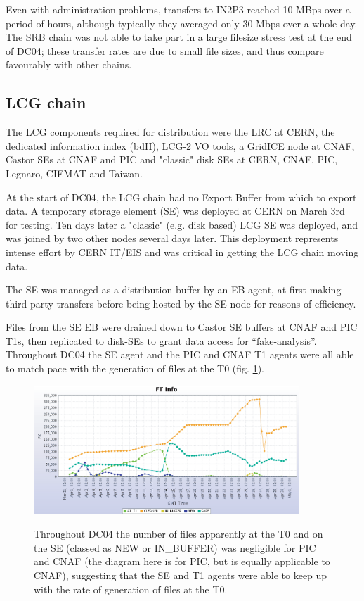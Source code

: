 \documentclass{cmspaper}
\begin{document}
Even with administration problems, transfers to IN2P3 reached 10 MBps over a period of hours, although typically they averaged only 30 Mbps over a whole day. The SRB chain was not able to take part in a large filesize stress test at the end of DC04; these transfer rates are due to small file sizes, and thus compare favourably with other chains.

\subsection{LCG chain}
The LCG components required for distribution were the LRC at CERN, the dedicated information index (bdII), LCG-2 VO tools, a GridICE node at CNAF, Castor SEs at CNAF and PIC and "classic" disk SEs at CERN, CNAF, PIC, Legnaro, CIEMAT and Taiwan.

At the start of DC04, the LCG chain had no Export Buffer from which to export data. A temporary storage element (SE) was deployed at CERN on March 3rd for testing. Ten days later a "classic" (e.g. disk based) LCG SE was deployed, and was joined by two other nodes several days later. This deployment represents intense effort by CERN IT/EIS and was critical in getting the LCG chain moving data.

The SE was managed as a distribution buffer by an EB agent, at first making third party transfers before being hosted by the SE node for reasons of efficiency.

Files from the SE EB were drained down to Castor SE buffers at CNAF and PIC T1s, then replicated to disk-SEs to grant data access for ``fake-analysis''. Throughout DC04 the SE agent and the PIC and CNAF T1 agents were all able to match pace with the generation of files at the T0 (fig. \ref{fig:PIC-FT}).

\begin{figure}[tbp]
\centering
\includegraphics[width=10cm]{PIC-FT.eps}
\label{fig:PIC-FT}
\caption{Throughout DC04 the number of files apparently at the T0 and on the SE (classed as NEW or IN\_BUFFER) was negligible for PIC and CNAF (the diagram here is for PIC, but is equally applicable to CNAF), suggesting that the SE and T1 agents were able to keep up with the rate of generation of files at the T0. }
\end{figure} 
\end{document}
